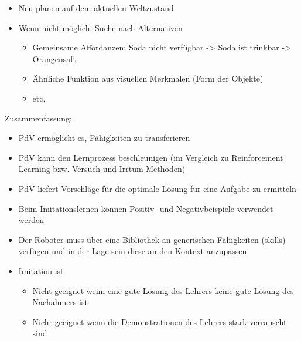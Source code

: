 \documentclass[paper=a4, fontsize=11pt]{scrartcl} %
\numberwithin{equation}{section} %
\numberwithin{figure}{section} %
\numberwithin{table}{section} %
\begin{document}
\begin{itemize}
\begin{itemize}
\begin{itemize}
\item Neu planen auf dem aktuellen Weltzustand
\item Wenn nicht möglich: Suche nach Alternativen
\begin{itemize}
\item Gemeinsame Affordanzen: Soda nicht verfügbar -> Soda ist trinkbar -> Orangensaft
\item Ähnliche Funktion aus visuellen Merkmalen (Form der Objekte)
\item etc.
\end{itemize}
\end{itemize}
\end{itemize}
\end{itemize}

Zusammenfassung:
\begin{itemize}
\item PdV ermöglicht es, Fähigkeiten zu transferieren
\item PdV kann den Lernprozess beschleunigen (im Vergleich zu Reinforcement Learning bzw. Versuch-und-Irrtum Methoden)
\item PdV liefert Vorschläge für die optimale Lösung für eine Aufgabe zu ermitteln
\item Beim Imitationslernen können Positiv- und Negativbeispiele verwendet werden
\item Der Roboter muss über eine Bibliothek an generischen Fähigkeiten (skills) verfügen und in der Lage sein diese an den Kontext anzupassen
\item Imitation ist
\begin{itemize}
\item Nicht geeignet wenn eine gute Lösung des Lehrers keine gute Lösung des Nachahmers ist
\item Nichr geeignet wenn die Demonstrationen des Lehrers stark verrauscht sind
\end{itemize}
\end{itemize}
\end{document}
